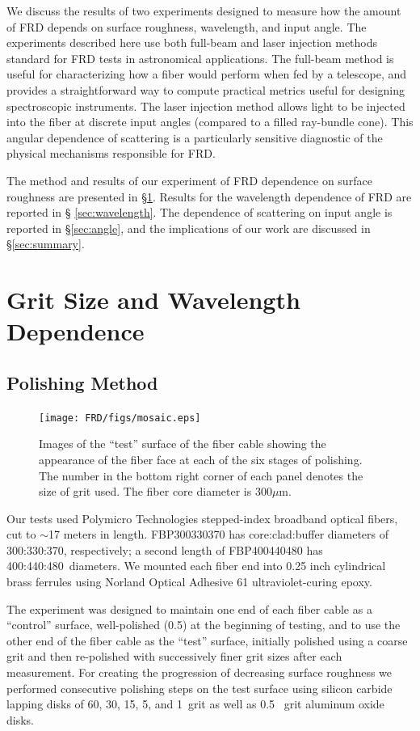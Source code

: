 We discuss the results of two experiments designed to measure how the
amount of FRD depends on surface roughness, wavelength, and input
angle. The experiments described here use both full-beam and laser
injection methods\cite{Carrasco} standard for FRD tests in
astronomical applications. The full-beam method is useful for
characterizing how a fiber would perform when fed by a telescope,
and provides a straightforward way to compute practical metrics useful
for designing spectroscopic instruments. The laser injection method
allows light to be injected into the fiber at discrete input angles
(compared to a filled ray-bundle cone). This angular dependence of
scattering is a particularly sensitive diagnostic of the physical
mechanisms responsible for FRD.

The method and results of our experiment of FRD dependence on surface
roughness are presented in \S \ref{sec:polish}. Results for the
wavelength dependence of FRD are reported in \S
\ref{sec:wavelength}. The dependence of scattering on input angle is
reported in \S \ref{sec:angle}, and the implications of our work are
discussed in \S \ref{sec:summary}.

\section{Grit Size and Wavelength Dependence}
\label{sec:polish}
\subsection{Polishing Method}
\begin{figure}[ht]
    \texttt{[image: FRD/figs/mosaic.eps]}
    \caption{Images of the ``test'' surface of the fiber cable showing
      the appearance of the fiber face at each of the six stages of
      polishing. The number in the bottom right corner of each panel
      denotes the size of grit used. The fiber core diameter is
      300$\mu$m.\label{fig:mosaic}}
\end{figure}

Our tests used Polymicro Technologies stepped-index broadband optical
fibers, cut to $\sim$17 meters in length.  FBP300330370 has
core:clad:buffer diameters of 300:330:370\mum, respectively; a second
length of FBP400440480 has 400:440:480\mum\ diameters.  We mounted
each fiber end into 0.25 inch cylindrical brass ferrules using Norland
Optical Adhesive 61 ultraviolet-curing epoxy.

The experiment was designed to maintain one end of each fiber cable as
a ``control'' surface, well-polished (0.5\mum) at the beginning of
testing, and to use the other end of the fiber cable as the ``test''
surface, initially polished using a coarse grit and then re-polished
with successively finer grit sizes after each measurement.  For
creating the progression of decreasing surface roughness we performed
consecutive polishing steps on the test surface using silicon carbide
lapping disks of 60, 30, 15, 5, and 1\mum\ grit as well as 0.5
\mum\ grit aluminum oxide disks.

